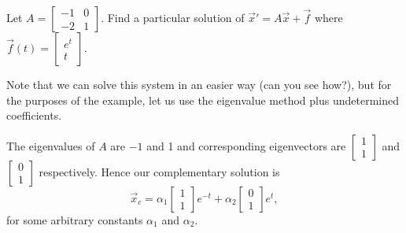 \begin{example}
Let $A = \left[
\begin{smallmatrix}
-1 & 0 \\
-2 & 1
\end{smallmatrix} \right]$.
Find a particular solution of ${\vec{x}}' = A \vec{x} +
\vec{f}$ where $\vec{f}(t) = 
\left[ \begin{smallmatrix}
e^t \\
t
\end{smallmatrix} \right]$.

Note that we can solve this system in an easier way (can you see how?), but
for the purposes of the example, let us use the eigenvalue method plus
undetermined coefficients.

The eigenvalues of $A$ are 
$-1$ and 1 and corresponding eigenvectors
are
$\left[ \begin{smallmatrix}
1 \\
1
\end{smallmatrix} \right]$ and
$\left[ \begin{smallmatrix}
0 \\
1
\end{smallmatrix} \right]$ respectively.
Hence our complementary solution is
\begin{equation*}
\vec{x}_c = 
\alpha_1
\begin{bmatrix}
1 \\ 1
\end{bmatrix}
e^{-t}
+
\alpha_2
\begin{bmatrix}
0 \\ 1
\end{bmatrix}
e^{t} ,
\end{equation*}
for some arbitrary constants $\alpha_1$ and $\alpha_2$.


\end{example}

